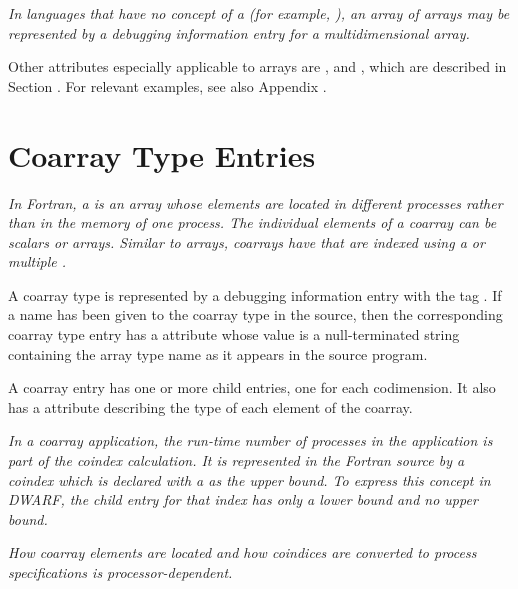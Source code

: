 \textit{In languages that have no concept of a 
 (for example, 
), an array of arrays may
be represented by a debugging information entry for a
multidimensional array.}

Other attributes especially applicable to arrays are
, 
 and 
,
which are described in 
Section . 
For relevant examples, see also Appendix .

\section{Coarray Type Entries}
\label{chap:coarraytypeentries}
\textit{In Fortran, a  is an array whose
elements are located in different processes rather than in the
memory of one process. The individual elements
of a coarray can be scalars or arrays.
Similar to arrays, coarrays have  that are 
indexed using a  or multiple .
}

A coarray type is represented by a debugging information entry 
with the tag .
If a name has been given to the 
coarray type in the source, then the corresponding coarray type 
entry has a \DWATname{} attribute whose value is a null-terminated 
string containing the array type name as it appears in the source 
program.

A coarray entry has one or more \DWTAGsubrangetype{} child entries,
one for each codimension. It also has a \DWATtype{} attribute 
describing the type of each element of the coarray.

\textit{In a coarray application, the run-time number of processes in the application
is part of the coindex calculation.  It is represented in the Fortran source by
a coindex which is declared with a \doublequote{*} as the upper bound.  To express this
concept in DWARF, the \DWTAGsubrangetype{} child entry for that index has 
only a lower bound and no upper bound.}

\textit{How coarray elements are located and how coindices are 
converted to process specifications is processor-dependent.}


